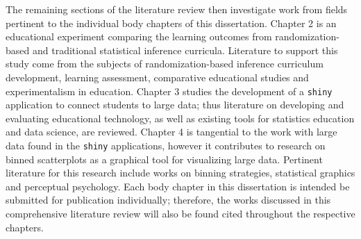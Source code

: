 \documentclass[11pt]{isuthesis}\usepackage[]{graphicx}\usepackage[]{color}
\newcommand\chaptocbreak{
	\addtocontents{toc}{\protect\needspace{4\baselineskip}}
	\addtocontents{lof}{\protect\needspace{2\baselineskip}}
	\addtocontents{lot}{\protect\needspace{2\baselineskip}}
}
\begin{document}
The remaining sections of the literature review then investigate work from fields pertinent to the individual body chapters of this dissertation. Chapter 2 is an educational experiment comparing the learning outcomes from randomization-based and traditional statistical inference curricula. Literature to support this study come from the subjects of randomization-based inference curriculum development, learning assessment, comparative educational studies and experimentalism in education. Chapter 3 studies the development of a \texttt{shiny} \citep{shiny} application to connect students to large data; thus literature on developing and evaluating educational technology, as well as existing tools for statistics education and data science, are reviewed. Chapter 4 is tangential to the work with large data found in the \texttt{shiny} applications, however it contributes to research on binned scatterplots as a graphical tool for visualizing large data. Pertinent literature for this research include works on binning strategies, statistical graphics and perceptual psychology. Each body chapter in this dissertation is intended be submitted for publication individually; therefore, the works discussed in this comprehensive literature review will also be found cited throughout the respective chapters.


% 
% 


\end{document}
